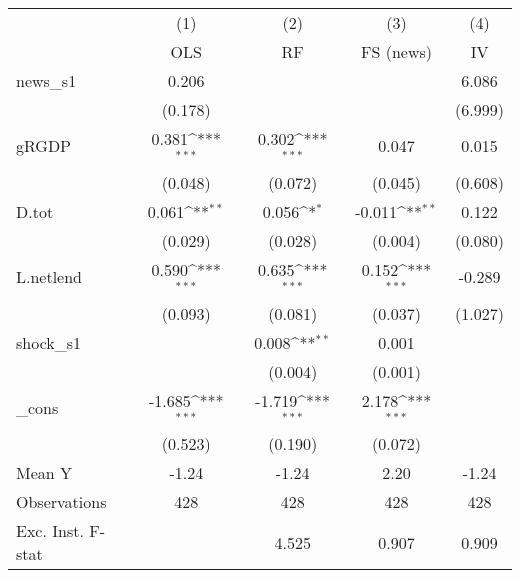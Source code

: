 {
\def\sym#1{\ifmmode^{#1}\else\(^{#1}\)\fi}
\begin{tabular}{l*{4}{c}}
\toprule
            &\multicolumn{1}{c}{(1)}&\multicolumn{1}{c}{(2)}&\multicolumn{1}{c}{(3)}&\multicolumn{1}{c}{(4)}\\
            &\multicolumn{1}{c}{OLS}&\multicolumn{1}{c}{RF}&\multicolumn{1}{c}{FS (news)}&\multicolumn{1}{c}{IV}\\
\midrule
news\_s1     &       0.206         &                     &                     &       6.086         \\
            &     (0.178)         &                     &                     &     (6.999)         \\
\addlinespace
gRGDP       &       0.381\sym{***}&       0.302\sym{***}&       0.047         &       0.015         \\
            &     (0.048)         &     (0.072)         &     (0.045)         &     (0.608)         \\
\addlinespace
D.tot       &       0.061\sym{**} &       0.056\sym{*}  &      -0.011\sym{**} &       0.122         \\
            &     (0.029)         &     (0.028)         &     (0.004)         &     (0.080)         \\
\addlinespace
L.netlend   &       0.590\sym{***}&       0.635\sym{***}&       0.152\sym{***}&      -0.289         \\
            &     (0.093)         &     (0.081)         &     (0.037)         &     (1.027)         \\
\addlinespace
shock\_s1    &                     &       0.008\sym{**} &       0.001         &                     \\
            &                     &     (0.004)         &     (0.001)         &                     \\
\addlinespace
\_cons      &      -1.685\sym{***}&      -1.719\sym{***}&       2.178\sym{***}&                     \\
            &     (0.523)         &     (0.190)         &     (0.072)         &                     \\
\midrule
Mean Y      &       -1.24         &       -1.24         &        2.20         &       -1.24         \\
Observations&         428         &         428         &         428         &         428         \\
Exc. Inst. F-stat&                     &       4.525         &       0.907         &       0.909         \\
\bottomrule
\end{tabular}
}
